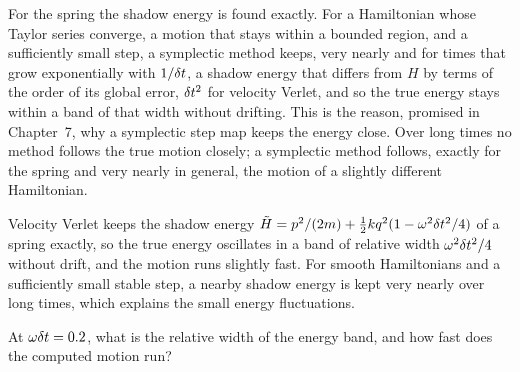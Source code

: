 For the spring the shadow energy is found exactly. For a Hamiltonian
whose Taylor series converge, a motion that stays within a bounded
region, and a sufficiently small step, a symplectic method keeps, very nearly and for times that grow
exponentially with $1/\delta t$, a shadow energy that differs from $H$ by terms
of the order of its global error, $\delta t^2$ for velocity Verlet, and so the
true energy stays within a band of that width without
drifting\cite{LeimkuhlerMatthews2015}. This is the reason, promised in
Chapter~7, why a symplectic step map keeps the energy close. Over long
times no method follows the true motion closely; a symplectic method
follows, exactly for the spring and very nearly in general, the motion of
a slightly different Hamiltonian.

\begin{keyidea}
Velocity Verlet keeps the shadow energy $\tilde{H} = p^2/(2m) + \frac12
kq^2(1 - \omega^2\delta t^2/4)$ of a spring exactly, so the true energy
oscillates in a band of relative width $\omega^2\delta t^2/4$ without drift,
and the motion runs slightly fast. For smooth Hamiltonians and a
sufficiently small stable step, a nearby shadow energy is kept very
nearly over long times, which explains the small energy fluctuations.
\end{keyidea}


\begin{selfcheck}
At $\omega\delta t = 0.2$, what is the relative width of the energy band, and
how fast does the computed motion run?
\end{selfcheck}
